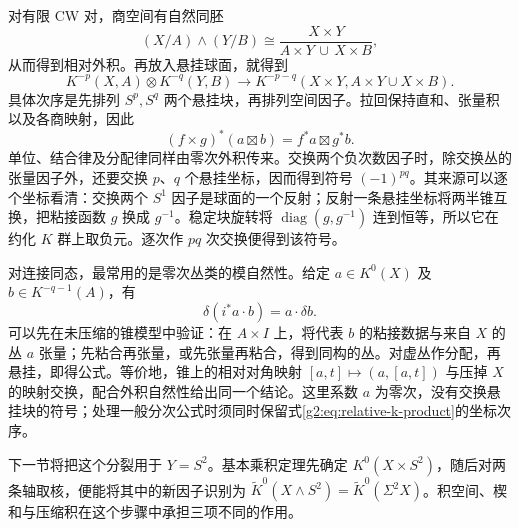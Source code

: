 对有限 CW 对，商空间有自然同胚
\[
	(X/A)\wedge(Y/B)
	\cong\frac{X\times Y}{A\times Y\,\cup\,X\times B},
\]
从而得到相对外积。再放入悬挂球面，就得到
\begin{equation}\label{g2:eq:relative-k-product}
	K^{-p}(X,A)\otimes K^{-q}(Y,B)
	\longrightarrow K^{-p-q}(X\times Y,A\times Y\cup X\times B).
\end{equation}
具体次序是先排列 \(S^p,S^q\) 两个悬挂块，再排列空间因子。拉回保持直和、张量积以及各商映射，因此
\[
	(f\times g)^*(a\boxtimes b)=f^*a\boxtimes g^*b.
\]
单位、结合律及分配律同样由零次外积传来。交换两个负次数因子时，除交换丛的张量因子外，还要交换 \(p\)、\(q\) 个悬挂坐标，因而得到符号 \((-1)^{pq}\)。其来源可以逐个坐标看清：交换两个 \(S^1\) 因子是球面的一个反射；反射一条悬挂坐标将两半锥互换，把粘接函数 \(g\) 换成 \(g^{-1}\)。稳定块旋转将 \(\operatorname{diag}(g,g^{-1})\) 连到恒等，所以它在约化 \(K\) 群上取负元。逐次作 \(pq\) 次交换便得到该符号。

对连接同态，最常用的是零次丛类的模自然性。给定 \(a\in K^0(X)\) 及 \(b\in K^{-q-1}(A)\)，有
\begin{equation}\label{g2:eq:k-boundary-module-zero}
	\delta(i^*a\cdot b)=a\cdot\delta b.
\end{equation}
可以先在未压缩的锥模型中验证：在 \(A\times I\) 上，将代表 \(b\) 的粘接数据与来自 \(X\) 的丛 \(a\) 张量；先粘合再张量，或先张量再粘合，得到同构的丛。对虚丛作分配，再悬挂，即得公式。等价地，锥上的相对对角映射 \([a,t]\mapsto(a,[a,t])\) 与压掉 \(X\) 的映射交换，配合外积自然性给出同一个结论。这里系数 \(a\) 为零次，没有交换悬挂块的符号；处理一般分次公式时须同时保留式\eqref{g2:eq:relative-k-product}的坐标次序。

下一节将把这个分裂用于 \(Y=S^2\)。基本乘积定理先确定 \(K^0(X\times S^2)\)，随后对两条轴取核，便能将其中的新因子识别为 \(\widetilde K^0(X\wedge S^2)=\widetilde K^0(\Sigma^2X)\)。积空间、楔和与压缩积在这个步骤中承担三项不同的作用。

